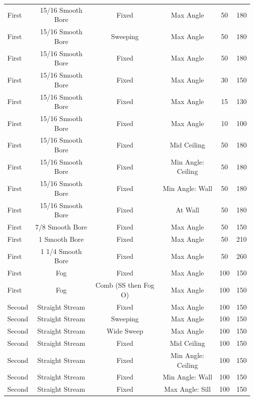 \documentclass{article}
\begin{document}
\begin{table}[!ht]
\begin{tabular}{lccccc}
First  & 15/16 Smooth Bore  & Fixed    & Max Angle            & 50 & 180 \\
First  & 15/16 Smooth Bore  & Sweeping & Max Angle            & 50 & 180 \\
First  & 15/16 Smooth Bore  & Fixed    & Max Angle            & 50 & 180 \\
First  & 15/16 Smooth Bore  & Fixed    & Max Angle            & 30 & 150 \\
First  & 15/16 Smooth Bore  & Fixed    & Max Angle            & 15 & 130 \\
First  & 15/16 Smooth Bore  & Fixed    & Max Angle            & 10 & 100 \\
First  & 15/16 Smooth Bore  & Fixed    & Mid Ceiling          & 50 & 180 \\
First  & 15/16 Smooth Bore  & Fixed    & Min Angle: Ceiling   & 50 & 180 \\
First  & 15/16 Smooth Bore  & Fixed    & Min Angle: Wall      & 50 & 180 \\
First  & 15/16 Smooth Bore  & Fixed    & At Wall              & 50 & 180 \\
First  & 7/8 Smooth Bore    & Fixed    & Max Angle            & 50 & 150 \\
First  & 1 Smooth Bore      & Fixed    & Max Angle            & 50 & 210 \\
First  & 1 1/4 Smooth Bore  & Fixed    & Max Angle            & 50 & 260 \\
First  & Fog                & Fixed    & Max Angle            & 100 & 150 \\
First  & Fog                & Comb (SS then Fog O) & Max Angle              & 100 & 150 \\
\midrule
Second & Straight Stream    & Fixed    & Max Angle               & 100 & 150 \\
Second & Straight Stream    & Sweeping & Max Angle               & 100 & 150 \\
Second & Straight Stream    & Wide Sweep & Max Angle             & 100 & 150 \\
Second & Straight Stream    & Fixed    & Mid Ceiling             & 100 & 150 \\
Second & Straight Stream    & Fixed    & Min Angle: Ceiling      & 100 & 150 \\
Second & Straight Stream    & Fixed    & Min Angle: Wall         & 100 & 150 \\
Second & Straight Stream    & Fixed    & Max Angle: Sill         & 100 & 150 \\

\end{tabular}
\end{table}
\end{document}
